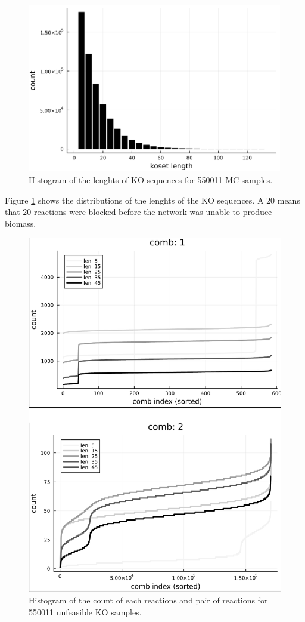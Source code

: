 \documentclass[
10pt, %
a4paper, %
oneside, %
headinclude,footinclude, %
BCOR5mm, %
]{scrartcl}
\begin{document}
\begin{figure}[h]
    \centering
    \includegraphics[width=0.8\columnwidth]{images/kosets_length.png}
    \caption[]{Histogram of the lenghts of KO sequences for 550011 MC samples. }
    \label{fig:kosets_length}
\end{figure}

Figure \ref{fig:kosets_length} shows the distributions of the lenghts of the KO sequences. 
A $20$ means that $20$ reactions were blocked before the network was unable to produce biomass.

\begin{figure}[h]
    \centering
    \includegraphics[width=0.8\columnwidth]{images/KOMC_comb1-2.png}
    \caption[]{Histogram of the count of each reactions and pair of reactions for 550011 unfeasible KO samples.}
    \label{fig:KOMC_comb1-2}
\end{figure}
\end{document}

